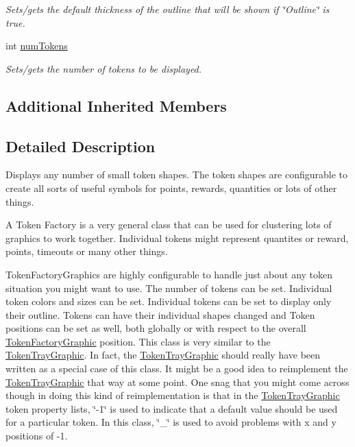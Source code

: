 \begin{DoxyCompactItemize}
\begin{DoxyCompactList}\small\item\em Sets/gets the default thickness of the outline that will be shown if \char`\"{}\-Outline\char`\"{} is true. \end{DoxyCompactList}\item 
\hypertarget{class_picto_1_1_token_factory_graphic_afc9f53c5dd48e8aed6a30350d34d6264}{int \hyperlink{class_picto_1_1_token_factory_graphic_afc9f53c5dd48e8aed6a30350d34d6264}{num\-Tokens}}\label{class_picto_1_1_token_factory_graphic_afc9f53c5dd48e8aed6a30350d34d6264}

\begin{DoxyCompactList}\small\item\em Sets/gets the number of tokens to be displayed. \end{DoxyCompactList}\end{DoxyCompactItemize}
\subsection*{Additional Inherited Members}


\subsection{Detailed Description}
Displays any number of small token shapes. The token shapes are configurable to create all sorts of useful symbols for points, rewards, quantities or lots of other things. 

A Token Factory is a very general class that can be used for clustering lots of graphics to work together. Individual tokens might represent quantites or reward, points, timeouts or many other things.

Token\-Factory\-Graphics are highly configurable to handle just about any token situation you might want to use. The number of tokens can be set. Individual token colors and sizes can be set. Individual tokens can be set to display only their outline. Tokens can have their individual shapes changed and Token positions can be set as well, both globally or with respect to the overall \hyperlink{class_picto_1_1_token_factory_graphic}{Token\-Factory\-Graphic} position. This class is very similar to the \hyperlink{class_picto_1_1_token_tray_graphic}{Token\-Tray\-Graphic}. In fact, the \hyperlink{class_picto_1_1_token_tray_graphic}{Token\-Tray\-Graphic} should really have been written as a special case of this class. It might be a good idea to reimplement the \hyperlink{class_picto_1_1_token_tray_graphic}{Token\-Tray\-Graphic} that way at some point. One snag that you might come across though in doing this kind of reimplementation is that in the \hyperlink{class_picto_1_1_token_tray_graphic}{Token\-Tray\-Graphic} token property lists, \char`\"{}-\/1\char`\"{} is used to indicate that a default value should be used for a particular token. In this class, \char`\"{}\-\_\-\char`\"{} is used to avoid problems with x and y positions of -\/1.

